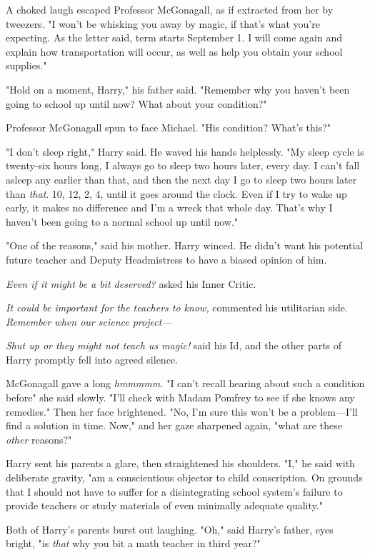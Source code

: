 A choked laugh escaped Professor McGonagall, as if extracted from her by
tweezers. "I won't be whisking you away by
magic, if that's what you're expecting. As the letter said,
term starts September 1. I will come again and explain
how transportation will occur, as well as help you obtain
your school supplies."

"Hold on a moment, Harry," his father said. "Remember why you haven't been
going to school up until now? What about your condition?"

Professor McGonagall spun to face Michael. "His condition? What's this?"

"I don't sleep right," Harry said. He waved his hands helplessly. "My sleep
cycle is twenty-six hours long, I always go to sleep two hours later, every
day. I can't fall asleep any earlier than that, and then the next day I go to
sleep two hours later than \emph{that}. 10\PM, 12\AM, 2\AM, 4\AM, until it goes
around the clock. Even if I try to wake up early, it makes no difference and
I'm a wreck that whole day. That's why I haven't been going to a normal school
up until now."

"One of the reasons," said his mother. Harry winced. He
didn't want his potential future teacher and Deputy
Headmistress to have a biased opinion of him.

\emph{Even if it might be a bit deserved?} asked his Inner Critic.

\emph{It could be important for the teachers to know,}
commented his utilitarian side. \emph{Remember when our science project—}

\emph{Shut up or they might not teach us magic!} said his Id,
and the other parts of Harry promptly fell into agreed silence.

McGonagall gave a long \emph{hmmmmm.} "I can't recall hearing about such a
condition before{\el}" she said slowly. "I'll check with Madam Pomfrey to
see if she knows any remedies." Then her face brightened. "No, I'm sure this
won't be a problem—I'll find a solution in time. Now," and her gaze sharpened
again, "what are these \emph{other} reasons?"

Harry sent his parents a glare, then straightened his
shoulders. "I," he said with deliberate gravity, "am a
conscientious objector to child conscription. On grounds that
I should not have to suffer for a disintegrating school
system's failure to provide teachers or study materials of
even minimally adequate quality."

Both of Harry's parents burst out laughing.
"Oh," said Harry's father, eyes bright, "is \emph{that} why you
bit a math teacher in third year?"

